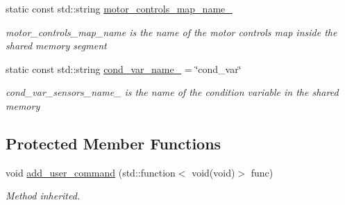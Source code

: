 \begin{DoxyCompactItemize}
static const std\+::string \hyperlink{classdynamic__graph_1_1DynamicGraphManager_a056de4d7a49496b2b0812d96d93370d9}{motor\+\_\+controls\+\_\+map\+\_\+name\+\_\+}
\begin{DoxyCompactList}\small\item\em motor\+\_\+controls\+\_\+map\+\_\+name is the name of the motor controls map inside the shared memory segment \end{DoxyCompactList}\item 
\mbox{\label{classdynamic__graph_1_1DynamicGraphManager_a909b8d2d024a2a11473fa2d94a18002e}} 
static const std\+::string \hyperlink{classdynamic__graph_1_1DynamicGraphManager_a909b8d2d024a2a11473fa2d94a18002e}{cond\+\_\+var\+\_\+name\+\_\+} = \char`\"{}cond\+\_\+var\char`\"{}
\begin{DoxyCompactList}\small\item\em cond\+\_\+var\+\_\+sensors\+\_\+name\+\_\+ is the name of the condition variable in the shared memory \end{DoxyCompactList}\end{DoxyCompactItemize}
\subsection*{Protected Member Functions}
\begin{DoxyCompactItemize}
\item 
void \hyperlink{classdynamic__graph_1_1DynamicGraphManager_a72146c4ddd173869a512e9f174ad48df}{add\+\_\+user\+\_\+command} (std\+::function$<$ void(void)$>$ func)
\begin{DoxyCompactList}\small\item\em Method inherited. \end{DoxyCompactList}\end{DoxyCompactItemize}
